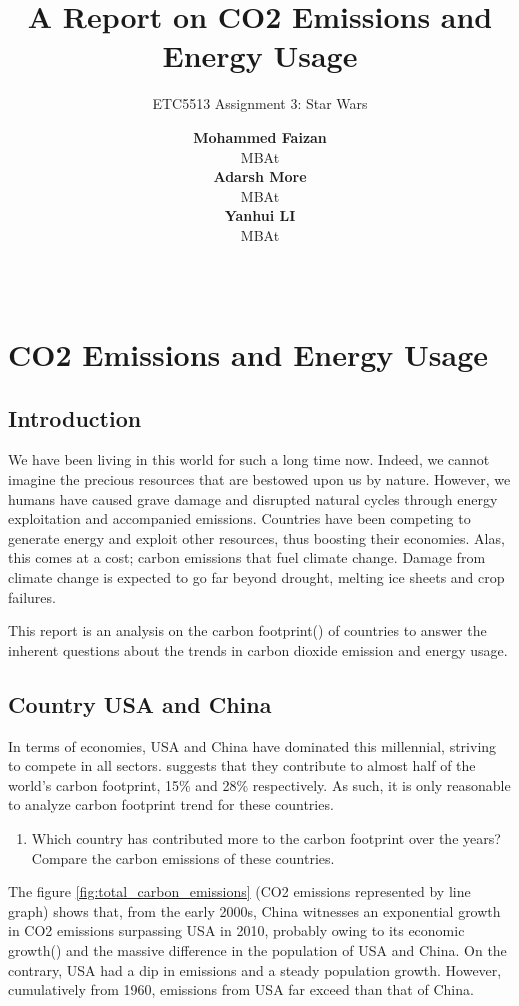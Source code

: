 \documentclass[11pt,a4paper,]{article}
\title{A Report on CO2 Emissions and Energy Usage}
\subtitle{ETC5513 Assignment 3: Star Wars}
\author{\sf\Large\textbf{ Mohammed Faizan}\\ {\sf\large MBAt\\[0.5cm]} \sf\Large\textbf{ Adarsh More}\\ {\sf\large MBAt\\[0.5cm]} \sf\Large\textbf{ Yanhui LI}\\ {\sf\large MBAt\\[0.5cm]}}
\date{\sf\Date~\Month~\Year}
\makeatletter
\providecommand{\tightlist}{%
  \setlength{\itemsep}{0pt}\setlength{\parskip}{0pt}}
\def\titlepage{\front{\expandafter{\@title}}{\@author}{\@organization}}
\makeatother
\begin{document}
\titlepage

{
\setcounter{tocdepth}{2}
\tableofcontents
}
\newpage
\section{CO2 Emissions and Energy Usage}
\subsection*{Introduction}

We have been living in this world for such a long time now. Indeed, we cannot imagine the precious resources that are bestowed upon us by nature. However, we humans have caused grave damage and disrupted natural cycles through energy exploitation and accompanied emissions. Countries have been competing to generate energy and exploit other resources, thus boosting their economies. Alas, this comes at a cost; carbon emissions that fuel climate change. Damage from climate change is expected to go far beyond drought, melting ice sheets and crop failures.

This report is an analysis on the carbon footprint(\textcite{caronfootprint}) of countries to answer the inherent questions about the trends in carbon dioxide emission and energy usage.

\newpage
\subsection{Country USA and China}

In terms of economies, USA and China have dominated this millennial, striving to compete in all sectors. \textcite{Carbon_footprint_countries} suggests that they contribute to almost half of the world's carbon footprint, 15\% and 28\% respectively. As such, it is only reasonable to analyze carbon footprint trend for these countries.

\begin{enumerate}
\def\labelenumi{\arabic{enumi})}
\tightlist
\item
  Which country has contributed more to the carbon footprint over the years? Compare the carbon emissions of these countries.
\end{enumerate}

The figure \ref{fig:total_carbon_emissions} (CO2 emissions represented by line graph) shows that, from the early 2000s, China witnesses an exponential growth in CO2 emissions surpassing USA in 2010, probably owing to its economic growth(\textcite{economicgrowth}) and the massive difference in the population of USA and China. On the contrary, USA had a dip in emissions and a steady population growth. However, cumulatively from 1960, emissions from USA far exceed than that of China.
\end{document}
